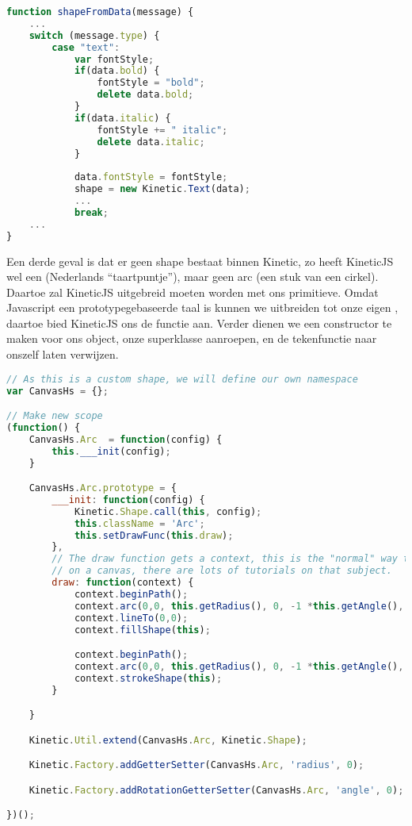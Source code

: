\begin{lstlisting}[language=JavaScript]
function shapeFromData(message) {
	...
	switch (message.type) {
		case "text":
			var fontStyle;
			if(data.bold) {
				fontStyle = "bold";
				delete data.bold;
			}
			if(data.italic) {
				fontStyle += " italic";
				delete data.italic;
			}
			
			data.fontStyle = fontStyle;
			shape = new Kinetic.Text(data);
			...
			break;
	...
}
\end{lstlisting}

Een derde geval is dat er geen shape bestaat binnen Kinetic, zo heeft KineticJS wel een  (Nederlands ``taartpuntje''), maar geen arc (een stuk van een cirkel). Daartoe zal KineticJS uitgebreid moeten worden met ons primitieve. Omdat Javascript een prototypegebaseerde taal is kunnen we  uitbreiden tot onze eigen , daartoe bied KineticJS ons de  functie aan. Verder dienen we een constructor te maken voor ons object, onze superklasse aanroepen, en de tekenfunctie naar onszelf laten verwijzen.

\begin{lstlisting}[style=densecode, language=JavaScript]
// As this is a custom shape, we will define our own namespace
var CanvasHs = {};

// Make new scope
(function() {
    CanvasHs.Arc  = function(config) {
        this.___init(config);
    }

    CanvasHs.Arc.prototype = {
        ___init: function(config) {
            Kinetic.Shape.call(this, config);
            this.className = 'Arc';
            this.setDrawFunc(this.draw);
        },
        // The draw function gets a context, this is the "normal" way to draw
        // on a canvas, there are lots of tutorials on that subject.
        draw: function(context) {
            context.beginPath();
            context.arc(0,0, this.getRadius(), 0, -1 *this.getAngle(), true);
            context.lineTo(0,0);
            context.fillShape(this);

            context.beginPath();
            context.arc(0,0, this.getRadius(), 0, -1 *this.getAngle(), true);
            context.strokeShape(this);
        }

    }

    Kinetic.Util.extend(CanvasHs.Arc, Kinetic.Shape);

    Kinetic.Factory.addGetterSetter(CanvasHs.Arc, 'radius', 0);

    Kinetic.Factory.addRotationGetterSetter(CanvasHs.Arc, 'angle', 0);

})();
\end{lstlisting}

